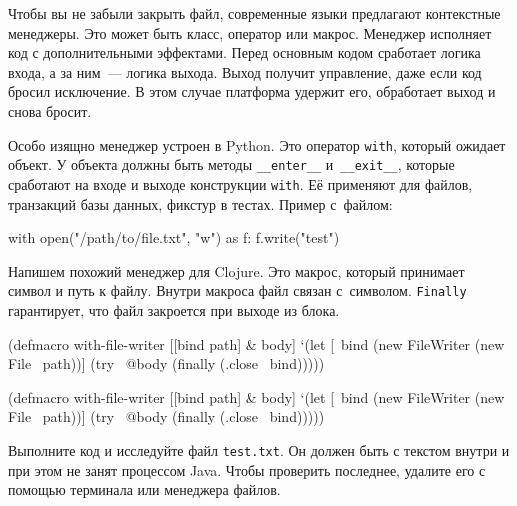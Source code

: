 Чтобы вы не забыли закрыть файл, современные языки предлагают контекстные
менеджеры. Это может быть класс, оператор или макрос. Менеджер исполняет код с
дополнительными эффектами. Перед основным кодом сработает логика входа, а за
ним~--- логика выхода. Выход получит управление, даже если код бросил
исключение. В этом случае платформа удержит его, обработает выход и снова
бросит.


Особо изящно менеджер устроен в Python. Это оператор \verb|with|, который
ожидает объект. У объекта должны быть методы \verb|__enter__| и~\verb|__exit__|,
которые сработают на входе и выходе конструкции \verb|with|. Её применяют для
файлов, транзакций базы данных, фикстур в тестах. Пример с~файлом:


\begin{english}
  \begin{python}
with open("/path/to/file.txt", "w") as f:
    f.write("test")
  \end{python}
\end{english}

Напишем похожий менеджер для Clojure. Это макрос, который принимает символ и
путь к файлу. Внутри макроса файл связан с~символом. \verb|Finally|
гарантирует, что файл закроется при выходе из блока.


\ifnarrow

\begin{english}
  \begin{clojure}
(defmacro with-file-writer
  [[bind path] & body]
  `(let [~bind (new FileWriter
                 (new File ~path))]
     (try
       ~@body
       (finally
         (.close ~bind)))))
  \end{clojure}
\end{english}

\else

\begin{english}
  \begin{clojure}
(defmacro with-file-writer
  [[bind path] & body]
  `(let [~bind (new FileWriter (new File ~path))]
     (try
       ~@body
       (finally
         (.close ~bind)))))
  \end{clojure}
\end{english}

\fi

Выполните код и исследуйте файл \verb|test.txt|. Он должен быть с текстом внутри
и при этом не занят процессом Java. Чтобы проверить последнее, удалите его с
помощью терминала или менеджера файлов.

